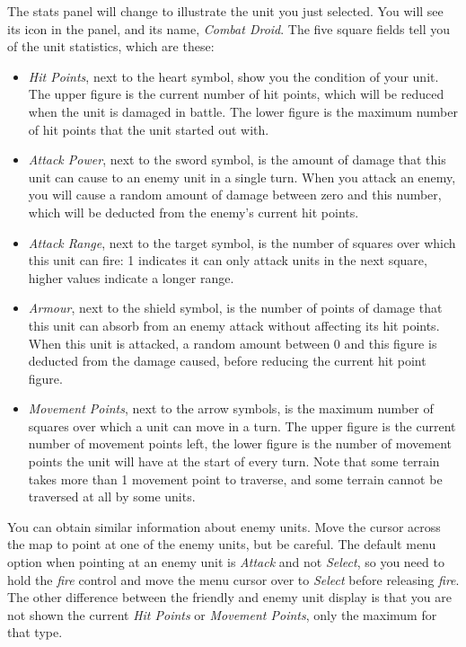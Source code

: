The stats panel will change to illustrate the unit you just selected. You will see its icon in the panel, and its name, {\it Combat Droid}. The five square fields tell you of the unit statistics, which are these:
\begin{itemize}

\item {\it Hit Points}, next to the heart symbol, show you the condition of your unit. The upper figure is the current number of hit points, which will be reduced when the unit is damaged in battle. The lower figure is the maximum number of hit points that the unit started out with.

\item {\it Attack Power}, next to the sword symbol, is the amount of damage that this unit can cause to an enemy unit in a single turn. When you attack an enemy, you will cause a random amount of damage between zero and this number, which will be deducted from the enemy's current hit points.

\item {\it Attack Range}, next to the target symbol, is the number of squares over which this unit can fire: 1 indicates it can only attack units in the next square, higher values indicate a longer range.

\item {\it Armour}, next to the shield symbol, is the number of points of damage that this unit can absorb from an enemy attack without affecting its hit points. When this unit is attacked, a random amount between 0 and this figure is deducted from the damage caused, before reducing the current hit point figure.

\item {\it Movement Points}, next to the arrow symbols, is the maximum number of squares over which a unit can move in a turn. The upper figure is the current number of movement points left, the lower figure is the number of movement points the unit will have at the start of every turn. Note that some terrain takes more than 1 movement point to traverse, and some terrain cannot be traversed at all by some units.
\end{itemize}

You can obtain similar information about enemy units. Move the cursor across the map to point at one of the enemy units, but be careful. The default menu option when pointing at an enemy unit is {\it Attack} and not {\it Select}, so you need to hold the {\it fire} control and move the menu cursor over to {\it Select} before releasing {\it fire}. The other difference between the friendly and enemy unit display is that you are not shown the current {\it Hit Points} or {\it Movement Points}, only the maximum for that type.


